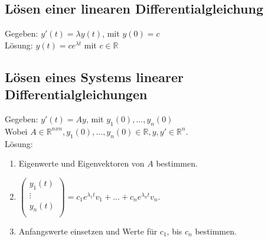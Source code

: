 \documentclass[german, 6pt]{latex4ei/latex4ei_sheet}
\begin{document}
\subsection{Lösen einer linearen Differentialgleichung}
Gegeben: $y'(t) = \lambda y(t)$, mit $y(0) = c$\\
Lösung: $y(t) = ce^{\lambda t}$ mit $c \in \mathbb R$\\
\subsection{Lösen eines Systems linearer Differentialgleichungen}
Gegeben: $y'(t) = Ay$, mit $y_1(0) , ..., y_n(0)$\\ 
Wobei $A \in \mathbb R^{nxn}, y_1(0) , ..., y_n(0) \in \mathbb R, y,y'\in\mathbb R^n$.\\
Lösung:\\
\begin{enumerate}
	\item Eigenwerte und Eigenvektoren von $A$ bestimmen.
	\item $\begin{pmatrix}
	y_1(t)\\
	\vdots\\
	y_n(t) \\
	\end{pmatrix}
	= c_1e^{\lambda_1t}v_1+...+c_ne^{\lambda_nt}v_n$.
	\item Anfangswerte einsetzen und Werte für $c_1$, bis $c_n$ bestimmen.
\end{enumerate}
\ \\
\end{document}

